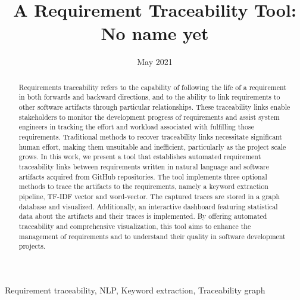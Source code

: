 \documentclass[conference]{IEEEtran}
\begin{document}
\title{A Requirement Traceability Tool: No name yet}
\author{
}

\date{May 2021}

\maketitle
\begin{abstract}
    Requirements traceability refers to the capability of following the life of a requirement in both forwards and backward directions, and to the ability to link requirements to other software artifacts through particular relationships. These traceability links enable stakeholders to monitor the development progress of requirements and assist system engineers in tracking the effort and workload associated with fulfilling those requirements. Traditional methods to recover traceability links necessitate significant human effort, making them unsuitable and inefficient, particularly as the project scale grows. In this work, we present a tool that establishes automated requirement traceability links between requirements written in natural language and software artifacts acquired from GitHub repositories. The tool implements three optional methods to trace the artifacts to the requirements, namely a keyword extraction pipeline, TF-IDF vector and word-vector. The captured traces are stored in a graph database and visualized. Additionally, an interactive dashboard featuring statistical data about the artifacts and their traces is implemented. By offering automated traceability and comprehensive visualization, this tool aims to enhance the management of requirements and to understand their quality in software development projects.
\end{abstract}
\begin{IEEEkeywords}
Requirement traceability, NLP, Keyword extraction, Traceability graph
\end{IEEEkeywords}


















\end{document}
